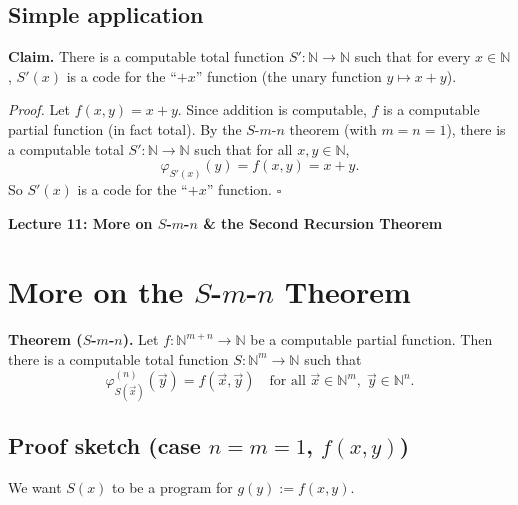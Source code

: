 \documentclass[11pt]{article}
\begin{document}
\subsection{Simple application}

\textbf{Claim.} There is a computable total function $S'\colon \mathbb{N} \to \mathbb{N}$ such that for every $x \in \mathbb{N}$, $S'(x)$ is a code for the ``$+x$'' function (the unary function $y \mapsto x+y$).

\textit{Proof.} Let $f(x,y) = x+y$. Since addition is computable, $f$ is a computable partial function (in fact total). By the $S$-$m$-$n$ theorem (with $m=n=1$), there is a computable total $S'\colon \mathbb{N} \to \mathbb{N}$ such that for all $x,y \in \mathbb{N}$,
\[
    \varphi_{S'(x)}(y) = f(x,y) = x+y.
\]
So $S'(x)$ is a code for the ``$+x$'' function. \hfill$\square$

\newpage
{\LARGE\bfseries Lecture 11: More on $S$-$m$-$n$ \& the Second Recursion Theorem}

\section{More on the $S$-$m$-$n$ Theorem}

\textbf{Theorem ($S$-$m$-$n$).} Let $f\colon \mathbb{N}^{m+n} \to \mathbb{N}$ be a computable partial function. Then there is a computable total function $S\colon \mathbb{N}^m \to \mathbb{N}$ such that
\[
    \varphi_{S(\vec{x})}^{(n)}(\vec{y}) = f(\vec{x}, \vec{y}) \quad \text{for all } \vec{x} \in \mathbb{N}^m,\; \vec{y} \in \mathbb{N}^n.
\]

\subsection{Proof sketch (case $n=m=1$, $f(x,y)$)}

We want $S(x)$ to be a program for $g(y) := f(x,y)$.
\end{document}
